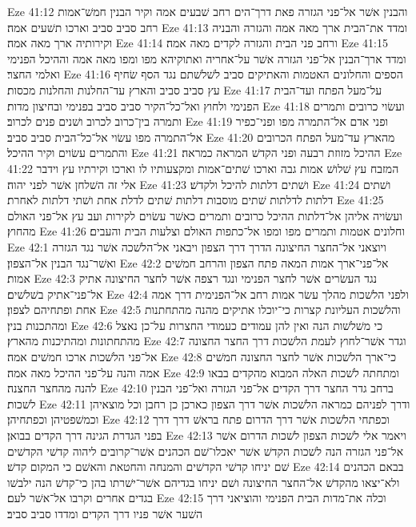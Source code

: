 Eze 41:12  והבנין אשׁר אל־פני הגזרה פאת דרך־הים רחב שׁבעים אמה וקיר הבנין חמשׁ־אמות רחב סביב סביב וארכו תשׁעים אמה׃
Eze 41:13  ומדד את־הבית ארך מאה אמה והגזרה והבניה וקירותיה ארך מאה אמה׃
Eze 41:14  ורחב פני הבית והגזרה לקדים מאה אמה׃
Eze 41:15  ומדד ארך־הבנין אל־פני הגזרה אשׁר על־אחריה ואתוקיהא מפו ומפו מאה אמה וההיכל הפנימי ואלמי החצר׃
Eze 41:16  הספים והחלונים האטמות והאתיקים סביב לשׁלשׁתם נגד הסף שׂחיף עץ סביב סביב והארץ עד־החלנות והחלנות מכסות׃
Eze 41:17  על־מעל הפתח ועד־הבית הפנימי ולחוץ ואל־כל־הקיר סביב סביב בפנימי ובחיצון מדות׃
Eze 41:18  ועשׂוי כרובים ותמרים ותמרה בין־כרוב לכרוב ושׁנים פנים לכרוב׃
Eze 41:19  ופני אדם אל־התמרה מפו ופני־כפיר אל־התמרה מפו עשׂוי אל־כל־הבית סביב סביב׃
Eze 41:20  מהארץ עד־מעל הפתח הכרובים והתמרים עשׂוים וקיר ההיכל׃
Eze 41:21  ההיכל מזוזת רבעה ופני הקדשׁ המראה כמראה׃
Eze 41:22  המזבח עץ שׁלושׁ אמות גבה וארכו שׁתים־אמות ומקצעותיו לו וארכו וקירתיו עץ וידבר אלי זה השׁלחן אשׁר לפני יהוה׃
Eze 41:23  ושׁתים דלתות להיכל ולקדשׁ׃
Eze 41:24  ושׁתים דלתות לדלתות שׁתים מוסבות דלתות שׁתים לדלת אחת ושׁתי דלתות לאחרת׃
Eze 41:25  ועשׂויה אליהן אל־דלתות ההיכל כרובים ותמרים כאשׁר עשׂוים לקירות ועב עץ אל־פני האולם מהחוץ׃
Eze 41:26  וחלונים אטמות ותמרים מפו ומפו אל־כתפות האולם וצלעות הבית והעבים׃
Eze 42:1  ויוצאני אל־החצר החיצונה הדרך דרך הצפון ויבאני אל־הלשׁכה אשׁר נגד הגזרה ואשׁר־נגד הבנין אל־הצפון׃
Eze 42:2  אל־פני־ארך אמות המאה פתח הצפון והרחב חמשׁים אמות׃
Eze 42:3  נגד העשׂרים אשׁר לחצר הפנימי ונגד רצפה אשׁר לחצר החיצונה אתיק אל־פני־אתיק בשׁלשׁים׃
Eze 42:4  ולפני הלשׁכות מהלך עשׂר אמות רחב אל־הפנימית דרך אמה אחת ופתחיהם לצפון׃
Eze 42:5  והלשׁכות העליונת קצרות כי־יוכלו אתיקים מהנה מהתחתנות ומהתכנות בנין׃
Eze 42:6  כי משׁלשׁות הנה ואין להן עמודים כעמודי החצרות על־כן נאצל מהתחתונות ומהתיכנות מהארץ׃
Eze 42:7  וגדר אשׁר־לחוץ לעמת הלשׁכות דרך החצר החצונה אל־פני הלשׁכות ארכו חמשׁים אמה׃
Eze 42:8  כי־ארך הלשׁכות אשׁר לחצר החצונה חמשׁים אמה והנה על־פני ההיכל מאה אמה׃
Eze 42:9  ומתחתה לשׁכות האלה המבוא מהקדים בבאו להנה מהחצר החצנה׃
Eze 42:10  ברחב גדר החצר דרך הקדים אל־פני הגזרה ואל־פני הבנין לשׁכות׃
Eze 42:11  ודרך לפניהם כמראה הלשׁכות אשׁר דרך הצפון כארכן כן רחבן וכל מוצאיהן וכמשׁפטיהן וכפתחיהן׃
Eze 42:12  וכפתחי הלשׁכות אשׁר דרך הדרום פתח בראשׁ דרך דרך בפני הגדרת הגינה דרך הקדים בבואן׃
Eze 42:13  ויאמר אלי לשׁכות הצפון לשׁכות הדרום אשׁר אל־פני הגזרה הנה לשׁכות הקדשׁ אשׁר יאכלו־שׁם הכהנים אשׁר־קרובים ליהוה קדשׁי הקדשׁים שׁם יניחו קדשׁי הקדשׁים והמנחה והחטאת והאשׁם כי המקום קדשׁ׃
Eze 42:14  בבאם הכהנים ולא־יצאו מהקדשׁ אל־החצר החיצונה ושׁם יניחו בגדיהם אשׁר־ישׁרתו בהן כי־קדשׁ הנה ילבשׁו בגדים אחרים וקרבו אל־אשׁר לעם׃
Eze 42:15  וכלה את־מדות הבית הפנימי והוציאני דרך השׁער אשׁר פניו דרך הקדים ומדדו סביב סביב׃
